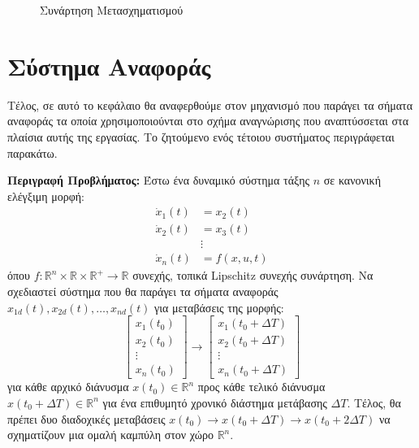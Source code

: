 \begin{figure}[t!]
	\centering
	
	\caption{Συνάρτηση Μετασχηματισμού}
	\label{fig:ppc_transformation_function}
\end{figure}



\section{Σύστημα Αναφοράς} \label{sec:ref_system}
Τέλος, σε αυτό το κεφάλαιο θα αναφερθούμε στον μηχανισμό που παράγει τα σήματα αναφοράς τα οποία χρησιμοποιούνται στο σχήμα αναγνώρισης που αναπτύσσεται στα πλαίσια αυτής της εργασίας. Το ζητούμενο ενός τέτοιου συστήματος περιγράφεται παρακάτω.

\textbf{Περιγραφή Προβλήματος:} Έστω ένα δυναμικό σύστημα τάξης $n$ σε κανονική ελέγξιμη μορφή:
\begin{equation}
\begin{split}
\dot{x}_1(t) &= x_2(t) \\
\dot{x}_2(t) &= x_3(t) \\
&\vdots \\
\dot{x}_n(t) &= f(x,u,t)
\end{split}
\label{eq:canonical_system}
\end{equation}
όπου $f:\mathbb{R}^n \times \mathbb{R}\times \mathbb{R}^+ \rightarrow \mathbb{R}$ συνεχής, τοπικά Lipschitz συνεχής συνάρτηση. Να σχεδιαστεί σύστημα που θα παράγει τα σήματα αναφοράς $x_{1d}(t), x_{2d}(t), \dots, x_{nd}(t)$ για μεταβάσεις της μορφής:
\begin{equation}
	\begin{bmatrix}
		x_1(t_0) \\ x_2(t_0) \\ \vdots \\ x_n(t_0)
	\end{bmatrix}
	\rightarrow
	\begin{bmatrix}
	 x_1(t_0+ \Delta T) \\ x_2(t_0+ \Delta T) \\ \vdots \\ x_n(t_0+ \Delta T)
	\end{bmatrix}
	\label{eq:ref_transition}
\end{equation}
για κάθε αρχικό διάνυσμα $x(t_0) \in  \mathbb{R}^n$ προς κάθε τελικό διάνυσμα $x(t_0+\Delta T) \in  \mathbb{R}^n$ για ένα επιθυμητό χρονικό διάστημα μετάβασης $\Delta T$. Τέλος, θα πρέπει δυο διαδοχικές μεταβάσεις 
$x(t_0) \rightarrow x(t_0+ \Delta T) \rightarrow x(t_0+ 2\Delta T)$ να σχηματίζουν μια ομαλή καμπύλη στον χώρο $\mathbb{R}^n$.

